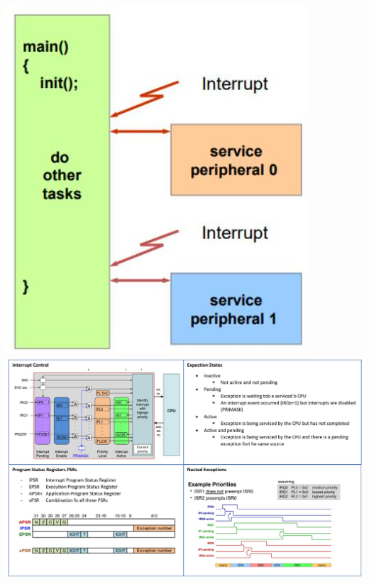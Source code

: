 \begin{itemize}
\includegraphics[width=\linewidth]{images/2024_12_29_79e6b22f503fb7b4f718g-11(2)}\\
\includegraphics[width=\linewidth]{images/2024_12_29_79e6b22f503fb7b4f718g-12}
\end{itemize}